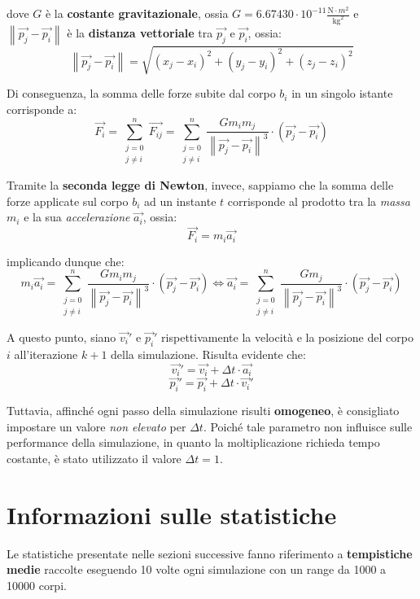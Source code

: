 \documentclass[12pt]{report}
\newcommand{\norm}[1]{\left\|#1\right\|}
\renewcommand\vec{\overrightarrow}
\begin{document}
    dove $G$ è la \textbf{costante gravitazionale}, ossia $G = 6.67430 \cdot 10^{-11} \frac{\mathrm{N} \cdot m^2}{\mathrm{kg}^2}$ e $\norm{\vec{p_j}-\vec{p_i}}$ è la \textbf{distanza vettoriale} tra $\vec{p_j}$ e $\vec{p_i}$, ossia:
    \[\norm{\vec{p_j}-\vec{p_i}} = \sqrt{(x_j - x_i)^2 + (y_j - y_i)^2 + (z_j - z_i)^2}\]

    Di conseguenza, la somma delle forze subite dal corpo $b_i$ in un singolo istante corrisponde a:
    \[\vec{F_i} = \sum_{\substack{j = 0 \\ j \neq i}}^n \vec{F_{ij}} = \sum_{\substack{j = 0 \\ j \neq i}}^n \frac{G m_i m_j}{\norm{\vec{p_j}-\vec{p_i}}^3} \cdot (\vec{p_j}-\vec{p_i})\]

    Tramite la \textbf{seconda legge di Newton}, invece, sappiamo che la somma delle forze applicate sul corpo $b_i$ ad un instante $t$ corrisponde al prodotto tra la \textit{massa} $m_i$ e la sua \textit{accelerazione} $\vec{a_i}$, ossia:
    \[\vec{F_i} = m_i \vec{a_i}\]
    
    implicando dunque che:
    \[m_i \vec{a_i} =  \sum_{\substack{j = 0 \\ j \neq i}}^n \frac{G m_i m_j}{\norm{\vec{p_j}-\vec{p_i}}^3} \cdot (\vec{p_j}-\vec{p_i}) \iff \vec{a_i} = \sum_{\substack{j = 0 \\ j \neq i}}^n \frac{G m_j}{\norm{\vec{p_j}-\vec{p_i}}^3} \cdot (\vec{p_j}-\vec{p_i})\]

    A questo punto, siano $\vec{v_i}'$ e $\vec{p_i}'$ rispettivamente la velocità e la posizione del corpo $i$ all'iterazione $k+1$ della simulazione. Risulta evidente che:
    \[\vec{v_i}' = \vec{v_i} + \Delta t \cdot \vec{a_i}\]
    \[\vec{p_i}' = \vec{p_i} + \Delta t \cdot \vec{v_i}'\]

    Tuttavia, affinché ogni passo della simulazione risulti \textbf{omogeneo}, è consigliato impostare un valore \textit{non elevato} per $\Delta t$. Poiché tale parametro non influisce sulle performance della simulazione, in quanto la moltiplicazione richieda tempo costante, è stato utilizzato il valore $\Delta t = 1$.
    
    \newpage

    \section{Informazioni sulle statistiche}

    Le statistiche presentate nelle sezioni successive fanno riferimento a \textbf{tempistiche medie} raccolte eseguendo 10 volte ogni simulazione con un range da 1000 a 10000 corpi.
    
\end{document}

